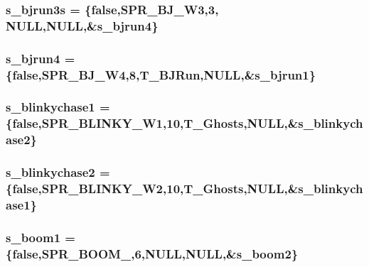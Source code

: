 \label{WL__ACT2_8C_a66113b56ff2490b2b358ee648f30c863}
\hypertarget{WL__ACT2_8C_a16013a265bf5766cf1ab6831b88ce7a8}{
\subsubsection[{s\_\-bjrun3s}]{ {\bf s\_\-bjrun3s} = \{false,SPR\_\-BJ\_\-W3,3, NULL,NULL,\&{\bf s\_\-bjrun4}\}}}
\label{WL__ACT2_8C_a16013a265bf5766cf1ab6831b88ce7a8}
\hypertarget{WL__ACT2_8C_a1d97b64475eb24f6cec22d432d8fcba1}{
\subsubsection[{s\_\-bjrun4}]{ {\bf s\_\-bjrun4} = \{false,SPR\_\-BJ\_\-W4,8,T\_\-BJRun,NULL,\&{\bf s\_\-bjrun1}\}}}
\label{WL__ACT2_8C_a1d97b64475eb24f6cec22d432d8fcba1}
\hypertarget{WL__ACT2_8C_a2a2fe6ee0d30959e050f2865d457b112}{
\subsubsection[{s\_\-blinkychase1}]{ {\bf s\_\-blinkychase1} = \{false,SPR\_\-BLINKY\_\-W1,10,T\_\-Ghosts,NULL,\&{\bf s\_\-blinkychase2}\}}}
\label{WL__ACT2_8C_a2a2fe6ee0d30959e050f2865d457b112}
\hypertarget{WL__ACT2_8C_a8c216682f7337d096e7bbd584590b317}{
\subsubsection[{s\_\-blinkychase2}]{ {\bf s\_\-blinkychase2} = \{false,SPR\_\-BLINKY\_\-W2,10,T\_\-Ghosts,NULL,\&{\bf s\_\-blinkychase1}\}}}
\label{WL__ACT2_8C_a8c216682f7337d096e7bbd584590b317}
\hypertarget{WL__ACT2_8C_a2a21a352d91ec680c37549be54df1e45}{
\subsubsection[{s\_\-boom1}]{ {\bf s\_\-boom1} = \{false,SPR\_\-BOOM\_,6,NULL,NULL,\&{\bf s\_\-boom2}\}}}
